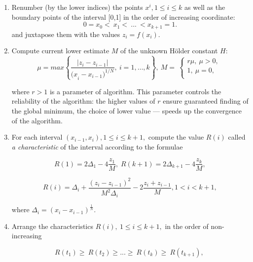 \documentclass{svproc}
\begin{document}
\begin{enumerate}
	
	\item  Renumber (by the lower indices) the points $x^i, 1\leq i\leq k$ as well as the boundary points of  the interval [0,1] in the order of increasing coordinate:  
	\begin{equation} 
		\label{agp1_sort} 	0=x_0<\ x_1<\ ...\ <x_{k+1}=1. 	
	\end{equation} 
	and juxtapose them with the values $z_i=f(x_i)$. 
	
	\item  Compute current lower estimate $M$ of the unknown H{\"o}lder constant $H$:  
	\begin{equation} 
		\label{agp2_mu} 	\mu=max\left\{\frac{|z_i-z_{i-1}|}{{{(x}_i-x_{i-1})}^{1/N}},\ i=1,\ldots,k\right\},\ M=\  \left\{\begin{matrix}r\mu,\ \mu>0,\\1,\ \mu=0,\\\end{matrix}\right.\ 	
	\end{equation} 
	
	
	where $r>1$ is a parameter of algorithm. This parameter controls the reliability of the algorithm: the  higher values of $r$ ensure guaranteed finding of the global minimum, the choice of lower value ---  speeds up the convergence of the algorithm. 
	
	\item  For each interval $(x_{i-1},x_i), 1\leq i\leq k+1,$ compute the value $R(i)$ called \textit{a  characteristic} of the interval according to the formulae 
	
	
	\begin{equation} 
		\label{agp3_R1} R(1)=2\Delta_1-4\dfrac{z_1}{M}, \; R(k+1)=2\Delta_{k+1}-4\dfrac{z_k}{M}, 
	\end{equation} 
	
	
	
	\begin{equation} 
		\label{agp3_Ri} R(i)=\Delta_i+\dfrac{(z_i-z_{i-1})^2}{M^2\Delta_i}-2\dfrac{z_i+z_{i-1}}{M},1<i<k+1, 
	\end{equation} 
	
	
	where \(\Delta_i=(x_i-x_{i-1})^\frac{1}{N}\).
	
	\item   Arrange the characteristics $R\left(i\right),\ 1\leq i \leq k+1,$ in the order of non-increasing 
	
	
	\begin{equation} 
		\label{agp4_R_sort} 	R\left(t_1\right)\geq\ R\left(t_2\right)\geq...\geq\ R\left(t_k\right)\geq\ R(t_{k+1}),\  
	\end{equation} 
	

\end{enumerate}
\end{document}
